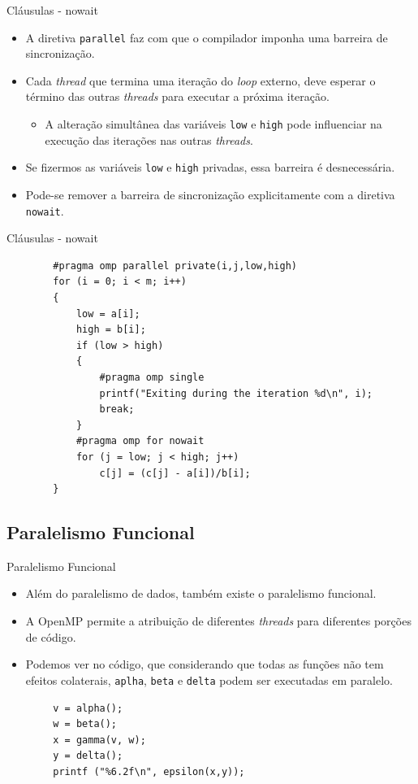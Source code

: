 \begin{frame}{Cláusulas - nowait}
	\begin{itemize}
		\item A diretiva \texttt{parallel} faz com que o compilador imponha uma barreira de sincronização.
		\medskip
		\item Cada \textit{thread} que termina uma iteração do \textit{loop} externo, deve esperar o término das outras \textit{threads} para executar a próxima iteração.
		\smallskip
		\begin{itemize}
			\item A alteração simultânea das variáveis \texttt{low} e \texttt{high} pode influenciar na execução das iterações nas outras \textit{threads}.
		\end{itemize}
		\medskip
		\item Se fizermos as variáveis \texttt{low} e \texttt{high} privadas, essa barreira é desnecessária.
		\medskip
		\item Pode-se remover a barreira de sincronização explicitamente com a diretiva \texttt{nowait}.
	\end{itemize}
\end{frame}

\begin{frame}[fragile]{Cláusulas - nowait}
		\begin{verbatim}
		#pragma omp parallel private(i,j,low,high)
		for (i = 0; i < m; i++)
		{
			low = a[i];
			high = b[i];
			if (low > high)
			{
				#pragma omp single
				printf("Exiting during the iteration %d\n", i);
				break;
			}
			#pragma omp for nowait
			for (j = low; j < high; j++)
				c[j] = (c[j] - a[i])/b[i];
		}
		\end{verbatim}
\end{frame}

\subsection{Paralelismo Funcional}

\begin{frame}[fragile]{Paralelismo Funcional}
	\begin{itemize}
		\item Além do paralelismo de dados, também existe o paralelismo funcional.
		\medskip
		\item A OpenMP permite a atribuição de diferentes \textit{threads} para diferentes porções de código.
		\medskip
		\item Podemos ver no código, que considerando que todas as funções não tem efeitos colaterais, \texttt{aplha}, \texttt{beta} e \texttt{delta} podem ser executadas em paralelo.
	\end{itemize}
	\begin{verbatim}
		v = alpha();
		w = beta();
		x = gamma(v, w);
		y = delta();
		printf ("%6.2f\n", epsilon(x,y));
	\end{verbatim}
\end{frame}
	
